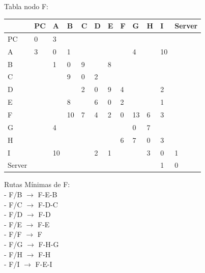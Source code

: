 \documentclass[a4paper]{article}
\begin{document}
\begin{table}[ht]
Tabla nodo F:\\
\begin{tabular}{|l|l|l|l|l|l|l|l|l|l|l|l|}
\hline
       & PC & A  & B  & C & D & E & F & G  & H & I  & Server \\ \hline
PC     & 0  & 3  &    &   &   &   &   &    &   &    &        \\ \hline
A      & 3  & 0  & 1  &   &   &   &   & 4  &   & 10 &        \\ \hline
B      &    & 1  & 0  & 9 &   & 8 &   &    &   &    &        \\ \hline
C      &    &    & 9  & 0 & 2 &   &   &    &   &    &        \\ \hline
D      &    &    &    & 2 & 0 & 9 & 4 &    &   & 2  &        \\ \hline
E      &    &    & 8  &   & 6 & 0 & 2 &    &   & 1  &        \\ \hline
F      &    &    & 10 & 7 & 4 & 2 & 0 & 13 & 6 & 3  &        \\ \hline
G      &    & 4  &    &   &   &   &   & 0  & 7 &    &        \\ \hline
H      &    &    &    &   &   &   & 6 & 7  & 0 & 3  &        \\ \hline
I      &    & 10 &    &   & 2 & 1 &   &    & 3 & 0  & 1      \\ \hline
Server &    &    &    &   &   &   &   &    &   & 1  & 0      \\ \hline
\end{tabular}

Rutas Mínimas de F:\\
-	F/B  $\rightarrow$  F-E-B\\
-	F/C  $\rightarrow$  F-D-C\\
-	F/D  $\rightarrow$  F-D\\
-	F/E  $\rightarrow$  F-E\\
-	F/F  $\rightarrow$  F\\
-	F/G  $\rightarrow$  F-H-G\\
-	F/H  $\rightarrow$  F-H\\
-	F/I  $\rightarrow$  F-E-I\\

\end{table}
\end{document}
